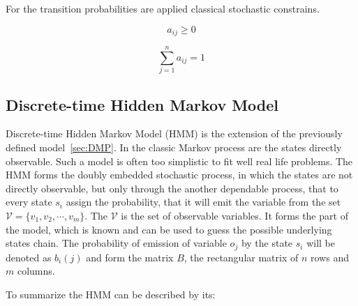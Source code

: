 \documentclass[thesis=M,english]{FITthesis}[2012/10/20]
\begin{document}
For the transition probabilities are applied classical stochastic constrains.

\begin{equation}
   a_{ij} \geq 0
\end{equation}

\begin{equation}
   \sum_{j=1}^n a_{ij} = 1
\end{equation}

\subsection{Discrete-time Hidden Markov Model}

Discrete-time Hidden Markov Model (HMM) is the extension of the previously defined model~\ref{sec:DMP}. In the classic Markov process are the states directly observable. Such a model is often too simplistic to fit well real life problems. The HMM forms the doubly embedded stochastic process, in which the states are not directly observable, but only through the another dependable process, that to every state $s_i$ assign the probability, that it will emit the variable from the set $\mathcal{V}=\{  v_1,v_2,\cdots,v_m\}$. The $\mathcal{V}$ is the set of observable variables. It forms the part of the model, which is known and can be used to guess the possible underlying states chain. The probability of emission of variable $o_j$ by the state $s_i$ will be denoted as $b_i(j)$ and form the matrix $B$, the rectangular matrix of $n$ rows and $m$ columns.
  
To summarize the HMM can be described by its:
\end{document}
